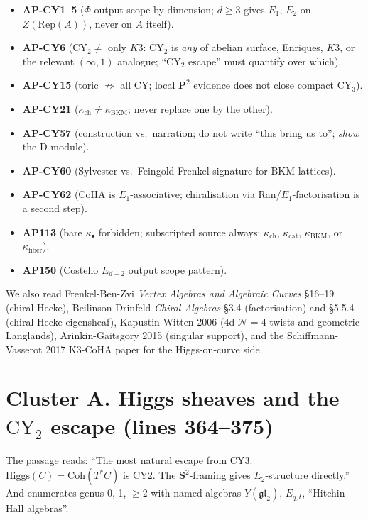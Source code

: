 \documentclass[11pt]{amsart}
\theoremstyle{definition}
\providecommand{\kch}{\kappa_{\mathrm{ch}}}
\providecommand{\kcat}{\kappa_{\mathrm{cat}}}
\providecommand{\kBKM}{\kappa_{\mathrm{BKM}}}
\providecommand{\CY}{\mathrm{CY}}
\providecommand{\Coh}{\mathrm{Coh}}
\providecommand{\Eone}{E_1}
\providecommand{\Etwo}{E_2}
\providecommand{\fgl}{\mathfrak{gl}}
\providecommand{\bP}{\mathbf{P}}
\providecommand{\bS}{\mathbf{S}}
\providecommand{\Rep}{\mathrm{Rep}}
\providecommand{\CoHA}{\mathrm{CoHA}}
\begin{document}
\begin{itemize}
 \item \textbf{AP-CY1--5} ($\Phi$ output scope by dimension; $d \geq 3$
   gives $\Eone$, $E_2$ on $Z(\Rep(A))$, never on $A$ itself).
 \item \textbf{AP-CY6} ($\CY_2 \neq$ only $K3$: $\CY_2$ is {\em any}
   of abelian surface, Enriques, $K3$, or the relevant $(\infty,1)$
   analogue; ``$\CY_2$ escape'' must quantify over which).
 \item \textbf{AP-CY15} (toric $\not\Rightarrow$ all CY; local $\bP^2$
   evidence does not close compact CY$_3$).
 \item \textbf{AP-CY21} ($\kch \neq \kBKM$; never replace one by the
   other).
 \item \textbf{AP-CY57} (construction vs.~narration; do not write
   ``this bring us to''; {\em show} the D-module).
 \item \textbf{AP-CY60} (Sylvester vs.~Feingold-Frenkel signature for
   BKM lattices).
 \item \textbf{AP-CY62} ($\CoHA$ is $E_1$-associative; chiralisation
   via Ran/$\Eone$-factorisation is a second step).
 \item \textbf{AP113} (bare $\kappa_{\bullet}$ forbidden; subscripted
   source always: $\kch$, $\kcat$, $\kBKM$, or $\kappa_{\mathrm{fiber}}$).
 \item \textbf{AP150} (Costello $E_{d-2}$ output scope pattern).
\end{itemize}

We also read Frenkel-Ben-Zvi \emph{Vertex Algebras and Algebraic
Curves} \S16--19 (chiral Hecke), Beilinson-Drinfeld
\emph{Chiral Algebras} \S3.4 (factorisation) and \S5.5.4 (chiral
Hecke eigensheaf), Kapustin-Witten 2006 (4d $\mathcal{N}=4$ twists and
geometric Langlands), Arinkin-Gaitsgory 2015 (singular support), and
the Schiffmann-Vasserot 2017 K3-CoHA paper for the Higgs-on-curve
side.

\section{Cluster A. Higgs sheaves and the $\CY_2$ escape (lines 364--375)}

The passage reads: ``The most natural escape from CY3:
$\mathrm{Higgs}(C) = \Coh(T^*C)$ is CY2. The $\bS^2$-framing gives
$\Etwo$-structure directly.'' And enumerates genus 0, 1, $\geq 2$ with
named algebras $Y(\fgl_2)$, $E_{q,t}$, ``Hitchin Hall algebras''.
\end{document}
